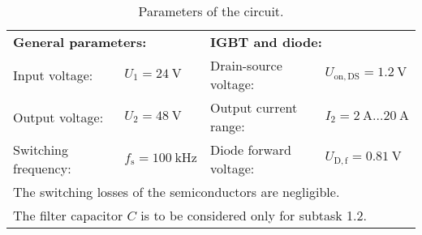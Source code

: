 \begin{table}[ht]
    \centering  %
    \begin{tabular}{llll}
        \toprule
        \multicolumn{2}{l}{\textbf{General parameters:}} & \multicolumn{2}{l}{\textbf{IGBT and diode:}} \\ 
        Input voltage: &  $U_{\mathrm{1}} = \SI{24}{\volt}$ & Drain-source voltage: & $U_{\mathrm{on},\mathrm{DS}} = \SI{1.2}{\volt}$ \\
        Output voltage: & $U_2 = \SI{48}{\volt}$  & Output current range: & $I_2 = \SI{2}{\ampere} \ldots \SI{20}{\ampere}$  \\
        Switching frequency: & $f_\mathrm{s} = \SI{100}{\kilo\hertz}$  & Diode forward voltage: & $U_{\mathrm{D},\mathrm{f}} = \SI{0.81}{\volt}$  \\
        \midrule
        \multicolumn{4}{l}{\quad The switching losses of the semiconductors are negligible.}  \\ 
        \multicolumn{4}{l}{\quad The filter capacitor $C$ is to be considered only for subtask 1.2.}  \\ 
        \bottomrule
    \end{tabular}
    \caption{Parameters of the circuit.}  %
    \label{table:ex01_Parameters of the circuit}
\end{table}



